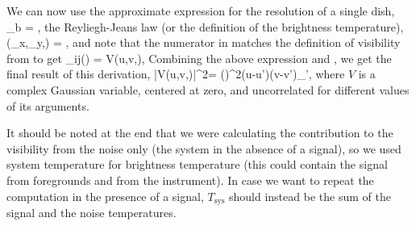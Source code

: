 We can now use the approximate expression for the resolution of a single dish,
\beq
\Omega_b = ,
\label{eq:Omegab}
\eeq
the Reyliegh-Jeans law (or the definition of the brightness temperature),
\beq
{}(\theta_x,\theta_y,\nu) = ,
\label{eq:I_Tsys}
\eeq
and note that the numerator in \eq{\ref{eq:rho_mathcalI}} matches the definition of visibility from \eq{\ref{eq:visibility}} to get 
\beq
\rho_{ij}(\nu) = V(u,v,\nu),
\label{eq:rho_V}
\eeq
Combining the above expression and \eq{\ref{eq:var_rho}}, we get the final result of this derivation,
\beq
\langle|V(u,v,\nu)|^2\rangle = \left(\right)^2\delta(u-u')\delta(v-v')\delta_{\nu\nu'},
\label{eq:Vrms_final}
\eeq
where $V$ is a complex Gaussian variable, centered at zero, and uncorrelated for different values of its arguments.

It should be noted at the end that we were calculating the contribution to the visibility from the noise only (the system in the absence of a signal), so we used system temperature for brightness temperature (this could contain the signal from foregrounds and from the instrument). In case we want to repeat the computation in the presence of a signal, $T_\text{sys}$ should instead be the sum of the signal and the noise temperatures.
